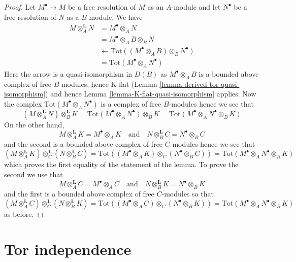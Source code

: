 \begin{proof}
Let $M^\bullet \to M$ be a free resolution of $M$ as an $A$-module
and let $N^\bullet$ be a free resolution of $N$ as a $B$-module.
We have
\begin{align*}
M \otimes_A^\mathbf{L} N
& =
M^\bullet \otimes_A N \\
& =
M^\bullet \otimes_A B \otimes_B N \\
& \leftarrow
\text{Tot}((M^\bullet \otimes_A B) \otimes_B N^\bullet) \\
& = \text{Tot}(M^\bullet \otimes_A N^\bullet)
\end{align*}
Here the arrow is a quasi-isomorphism in $D(B)$ as $M^\bullet \otimes_A B$
is a bounded above complex of free $B$-modules, hence K-flat
(Lemma \ref{lemma-derived-tor-quasi-isomorphism})
and hence Lemma \ref{lemma-K-flat-quasi-isomorphism} applies.
Now the complex $\text{Tot}(M^\bullet \otimes_A N^\bullet)$ is a
complex of free $B$-modules hence we see that
$$
(M \otimes_A^\mathbf{L} N) \otimes_B^\mathbf{L} K =
\text{Tot}(M^\bullet \otimes_A N^\bullet) \otimes_B K =
\text{Tot}(M^\bullet \otimes_A N^\bullet \otimes_B K)
$$
On the other hand,
$$
M \otimes_A^\mathbf{L} K = M^\bullet \otimes_A K
\quad\text{and}\quad
N \otimes_B^\mathbf{L} C = N^\bullet \otimes_B C
$$
and the second is a bounded above
complex of free $C$-modules hence we see that
$$
(M \otimes_A^\mathbf{L} K) \otimes_C^\mathbf{L} (N \otimes_B^\mathbf{L} C) =
\text{Tot}((M^\bullet \otimes_A K) \otimes_C (N^\bullet \otimes_B C)) =
\text{Tot}(M^\bullet \otimes_A N^\bullet \otimes_B K)
$$
which proves the first equality of the statement of the lemma.
To prove the second we use that
$$
M \otimes_A^\mathbf{L} C = M^\bullet \otimes_A C
\quad\text{and}\quad
N \otimes_B^\mathbf{L} K = N^\bullet \otimes_B K
$$
and the first is a bounded above complex of free $C$-modules so that
$$
(M \otimes_A^\mathbf{L} C) \otimes_C^\mathbf{L} (N \otimes_B^\mathbf{L} K) =
\text{Tot}((M^\bullet \otimes_A C) \otimes_C (N^\bullet \otimes_B K)) =
\text{Tot}(M^\bullet \otimes_A N^\bullet \otimes_B K)
$$
as before.
\end{proof}






\section{Tor independence}
\label{section-tor-independence}

